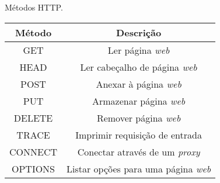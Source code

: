 \begin{quadro}[H]
	\centering
	\caption{Métodos HTTP.\label{qua:metodoshttp}}
	\begin{tabular}{| c | c |}
		\hline
		\textbf{Método} & \textbf{Descrição}							 \\
		\hline
		GET             & Ler página \textit{web}					             \\
		\hline
		HEAD            & Ler cabeçalho de página \textit{web}					 \\
		\hline
		POST            & Anexar à página \textit{web}					         \\
		\hline
		PUT             & Armazenar página \textit{web}                            \\
		\hline
		DELETE          & Remover página \textit{web }                             \\
		\hline
		TRACE           & Imprimir requisição de entrada                  \\
		\hline
		CONNECT         & Conectar através de um \textit{proxy}                    \\
		\hline
		OPTIONS         & Listar opções para uma página \textit{web}               \\
		\hline
	\end{tabular}
\end{quadro}